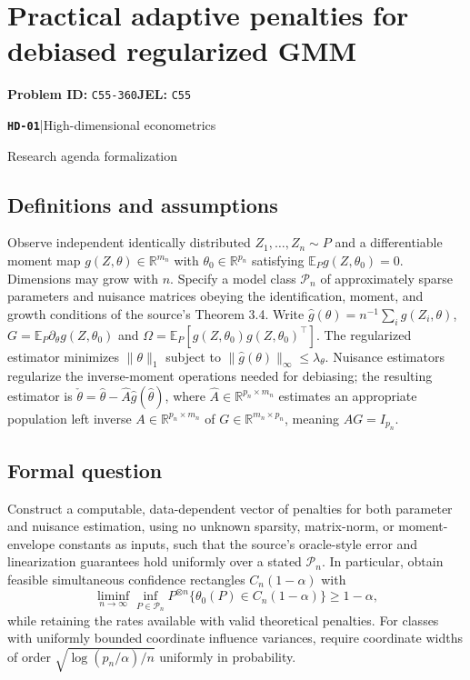 \documentclass[11pt,a4paper]{article}
\newcommand{\R}{\mathbb R}
\newcommand{\E}{\mathbb E}
\newcommand{\entrymeta}[3]{{\sffamily\small\color{muted}\textbf{\texttt{#1}}\quad|\quad #2\par #3\par}}
\begin{document}
\section*{Practical adaptive penalties for debiased regularized GMM}
\textbf{Problem ID:} \texttt{C55-360}\quad \textbf{JEL:} \texttt{C55}\par
\label{problem:OP-0577}
\label{beyond:HD-01}
\entrymeta{HD-01}{High-dimensional econometrics}{Research agenda formalization}
\subsection*{Definitions and assumptions}
Observe independent identically distributed $Z_1,\ldots,Z_n\sim P$ and
a differentiable moment map $g(Z,\theta)\in\R^{m_n}$ with
$\theta_0\in\R^{p_n}$ satisfying $\E_Pg(Z,\theta_0)=0$.
Dimensions may grow with $n$. Specify a model class $\mathcal P_n$ of
approximately sparse parameters and nuisance matrices obeying the
identification, moment, and growth conditions of the source's
Theorem 3.4. Write
$\widehat g(\theta)=n^{-1}\sum_i g(Z_i,\theta)$,
$G=\E_P\partial_\theta g(Z,\theta_0)$ and
$\Omega=\E_P[g(Z,\theta_0)g(Z,\theta_0)^\top]$.
The regularized estimator minimizes $\|\theta\|_1$ subject to
$\|\widehat g(\theta)\|_\infty\leq\lambda_\theta$.
Nuisance estimators regularize the inverse-moment operations needed
for debiasing; the resulting estimator is
$\check\theta=\widehat\theta-\widehat A\widehat g(\widehat\theta)$,
where $\widehat A\in\R^{p_n\times m_n}$ estimates an appropriate
population left inverse $A\in\R^{p_n\times m_n}$ of
$G\in\R^{m_n\times p_n}$, meaning $AG=I_{p_n}$.
\subsection*{Formal question}
Construct a computable, data-dependent vector of penalties for both
parameter and nuisance estimation, using no unknown sparsity,
matrix-norm, or moment-envelope constants as inputs, such that the
source's oracle-style error and linearization guarantees hold uniformly
over a stated $\mathcal P_n$. In particular, obtain feasible simultaneous
confidence rectangles $C_n(1-\alpha)$ with
\[
 \liminf_{n\to\infty}\inf_{P\in\mathcal P_n}
 P^{\otimes n}\{\theta_0(P)\in C_n(1-\alpha)\}\geq1-\alpha,
\]
while retaining the rates available with valid theoretical penalties.
For classes with uniformly bounded coordinate influence variances,
require coordinate widths of order
$\sqrt{\log(p_n/\alpha)/n}$ uniformly in probability.
\end{document}
